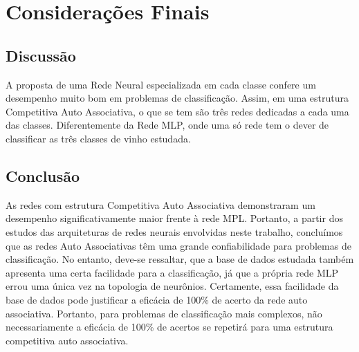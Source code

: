 \section{Considerações Finais} \label{consideracoesFinais}

\subsection{Discussão}

A proposta de uma Rede Neural especializada em cada classe confere um desempenho muito bom em problemas de classificação. Assim, em uma estrutura Competitiva Auto Associativa, o que se tem são três redes dedicadas a cada uma das classes. Diferentemente da Rede MLP, onde uma só rede tem o dever de classificar as três classes de vinho estudada.


\subsection{Conclusão}

As redes com estrutura Competitiva Auto Associativa demonstraram um desempenho significativamente maior frente à rede MPL. Portanto, a partir dos estudos das arquiteturas de redes neurais envolvidas neste trabalho, concluímos que as redes Auto Associativas têm uma grande confiabilidade para problemas de classificação. No entanto, deve-se ressaltar, que a base de dados estudada também apresenta uma certa facilidade para a classificação, já que a própria rede MLP errou uma única vez na topologia de neurônios. Certamente, essa facilidade da base de dados pode justificar a eficácia de 100\% de acerto da rede auto associativa. Portanto, para problemas de classificação mais complexos, não necessariamente a eficácia de 100\% de acertos se repetirá para uma estrutura competitiva auto associativa.
